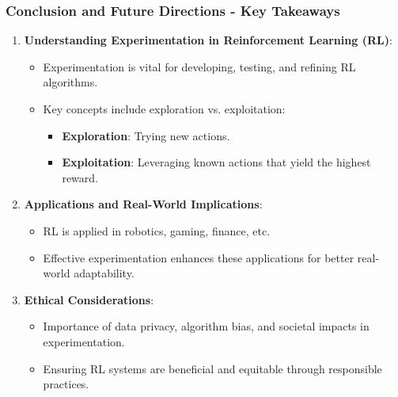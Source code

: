 \documentclass[aspectratio=169]{beamer}
\begin{document}
\begin{frame}[fragile]
  \frametitle{Conclusion and Future Directions - Key Takeaways}
  \begin{enumerate}
    \item \textbf{Understanding Experimentation in Reinforcement Learning (RL)}:
    \begin{itemize}
      \item Experimentation is vital for developing, testing, and refining RL algorithms.
      \item Key concepts include exploration vs. exploitation:
      \begin{itemize}
        \item \textbf{Exploration}: Trying new actions.
        \item \textbf{Exploitation}: Leveraging known actions that yield the highest reward.
      \end{itemize}
    \end{itemize}
    
    \item \textbf{Applications and Real-World Implications}:
    \begin{itemize}
      \item RL is applied in robotics, gaming, finance, etc.
      \item Effective experimentation enhances these applications for better real-world adaptability.
    \end{itemize}
    
    \item \textbf{Ethical Considerations}:
    \begin{itemize}
      \item Importance of data privacy, algorithm bias, and societal impacts in experimentation.
      \item Ensuring RL systems are beneficial and equitable through responsible practices.
    \end{itemize}
  \end{enumerate}
\end{frame}
\end{document}
